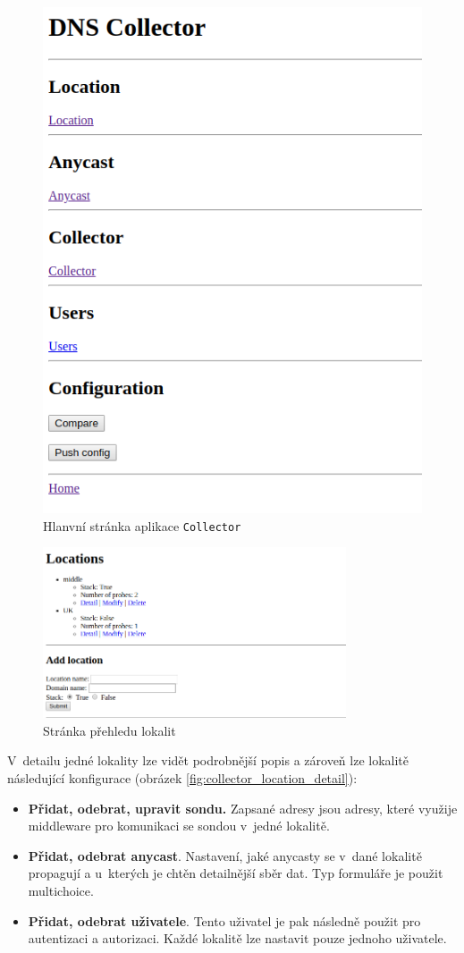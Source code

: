 \documentclass[thesis=M,czech]{src/FITthesis}[2019/12/23]
\begin{document}
\begin{figure}[ht]
  \centering
   \includegraphics[height=0.5\textwidth]{images/collector-index.png}
   \caption{Hlanvní stránka aplikace \texttt{Collector}}
     \label{fig:collector-index}
\end{figure}

\begin{figure}[ht]
  \centering
   \includegraphics[width=0.8\textwidth]{images/collector_location.png}
   \caption{Stránka přehledu lokalit}
     \label{fig:collector_location}
\end{figure} 

V~detailu jedné lokality lze vidět podrobnější popis a zároveň lze lokalitě následující konfigurace (obrázek \ref{fig:collector_location_detail}): 
\begin{itemize}
	\item \textbf{Přidat, odebrat, upravit sondu.} Zapsané adresy jsou adresy, které využije middleware pro komunikaci se sondou v~jedné lokalitě.
	\item \textbf{Přidat, odebrat anycast}. Nastavení, jaké anycasty se v~dané lokalitě propagují a u~kterých je chtěn detailnější sběr dat. Typ formuláře je použit multichoice. 
	\item \textbf{Přidat, odebrat uživatele}. Tento uživatel je pak následně použit pro autentizaci a autorizaci. Každé lokalitě lze nastavit pouze jednoho uživatele.
\end{itemize} 
\end{document}
